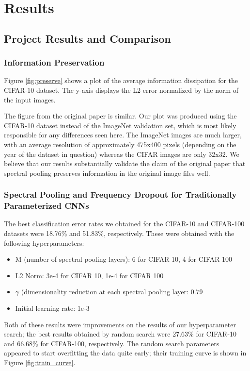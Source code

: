 \documentclass[10pt,journal,compsoc]{IEEEtran}
\begin{document}
\section{Results}

\subsection{Project Results and Comparison}

\subsubsection{Information Preservation}

Figure \ref{fig:preserve} shows a plot of the average information dissipation for the CIFAR-10 dataset. The y-axis displays the L2 error normalized by the norm of the input images.

The figure from the original paper is similar. Our plot was produced using the CIFAR-10 dataset instead of the ImageNet validation set, which is most likely responsible for any differences seen here. The ImageNet images are much larger, with an average resolution of approximately 475x400 pixels (depending on the year of the dataset in question) whereas the CIFAR images are only 32x32. We believe that our results substantially validate the claim of the original paper that spectral pooling preserves information in the original image files well.

\subsubsection{Spectral Pooling and Frequency Dropout for Traditionally Parameterized CNNs}

The best classification error rates we obtained for the CIFAR-10 and CIFAR-100 datasets were 18.76\% and 51.83\%, respectively. These were obtained with the following hyperparameters:

\begin{itemize}
\item M (number of spectral pooling layers): 6 for CIFAR 10, 4 for CIFAR 100
\item L2 Norm: 3e-4 for CIFAR 10, 1e-4 for CIFAR 100
\item $\gamma$ (dimensionality reduction at each spectral pooling layer: 0.79
\item Initial learning rate: 1e-3
\end{itemize}

Both of these results were improvements on the results of our hyperparameter search; the best results obtained by random search were 27.63\% for CIFAR-10 and 66.68\% for CIFAR-100, respectively. The random search parameters appeared to start overfitting the data quite early; their training curve is shown in Figure \ref{fig:train_curve}.
\end{document}

